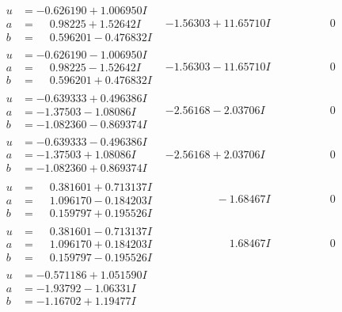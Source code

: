 \documentclass[1p]{elsarticle_modified}
\theoremstyle{definition}
\begin{document}
$$\begin{array}{c|c|c}
\begin{aligned}
u &= -0.626190 + 1.006950 I \\
a &= \phantom{-}0.98225 + 1.52642 I \\
b &= \phantom{-}0.596201 - 0.476832 I\end{aligned}
 & -1.56303 + 11.65710 I & \phantom{-0.000000 } 0 \\ \hline\begin{aligned}
u &= -0.626190 - 1.006950 I \\
a &= \phantom{-}0.98225 - 1.52642 I \\
b &= \phantom{-}0.596201 + 0.476832 I\end{aligned}
 & -1.56303 - 11.65710 I & \phantom{-0.000000 } 0 \\ \hline\begin{aligned}
u &= -0.639333 + 0.496386 I \\
a &= -1.37503 - 1.08086 I \\
b &= -1.082360 - 0.869374 I\end{aligned}
 & -2.56168 - 2.03706 I & \phantom{-0.000000 } 0 \\ \hline\begin{aligned}
u &= -0.639333 - 0.496386 I \\
a &= -1.37503 + 1.08086 I \\
b &= -1.082360 + 0.869374 I\end{aligned}
 & -2.56168 + 2.03706 I & \phantom{-0.000000 } 0 \\ \hline\begin{aligned}
u &= \phantom{-}0.381601 + 0.713137 I \\
a &= \phantom{-}1.096170 - 0.184203 I \\
b &= \phantom{-}0.159797 + 0.195526 I\end{aligned}
 & \phantom{-0.000000 } -1.68467 I & \phantom{-0.000000 } 0 \\ \hline\begin{aligned}
u &= \phantom{-}0.381601 - 0.713137 I \\
a &= \phantom{-}1.096170 + 0.184203 I \\
b &= \phantom{-}0.159797 - 0.195526 I\end{aligned}
 & \phantom{-0.000000 -}1.68467 I & \phantom{-0.000000 } 0 \\ \hline\begin{aligned}
u &= -0.571186 + 1.051590 I \\
a &= -1.93792 - 1.06331 I \\
b &= -1.16702 + 1.19477 I\end{aligned}

\end{array}$$
\end{document}
